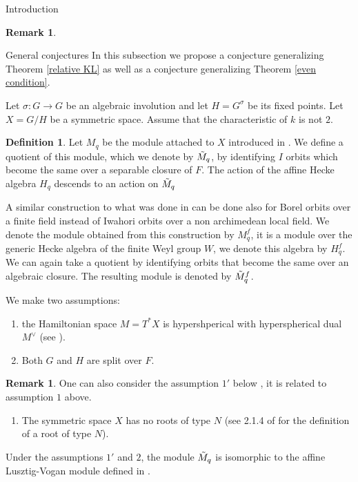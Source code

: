 \documentclass[12pt]{article}
\newcommand{\<}{\langle}
\renewcommand{\>}{\rangle}
\theoremstyle{plain}
\theoremstyle{definition}
\newtheorem{Remark}[theorem]{Remark}
\newtheorem{defn}[theorem]{Definition}
\begin{document}
\begin{section}{Introduction}
\begin{Remark}
\end{Remark}
  
 

\begin{subsection}{General conjectures}
In this subsection we propose a conjecture generalizing Theorem \ref{relative KL} as well as a conjecture generalizing Theorem \ref{even condition}. 

Let $\sigma:G\rightarrow G$ be an algebraic involution and let $H=G^\sigma$ be its fixed points. Let $X=G/H$ be a symmetric space. Assume that the characteristic of $k$ is not $2.$

\begin{defn}
Let $M_q$ be the module attached to $X$ introduced in \cite{my}. We define a quotient of this module, which we denote by $\Tilde{M}_q$, by identifying $I$ orbits which become the same over a separable closure of $F$. The action of the affine Hecke algebra $H_q$ descends to an action on $\Tilde{M}_q$ 


A similar construction to what was done in \cite{my} can be done also for Borel orbits over a finite field instead of Iwahori orbits over a non archimedean local field. We denote the module obtained from this construction by $M^f_q$, it is a module over the generic Hecke algebra of the finite Weyl group $W$, we denote this algebra by $H^f_q$. We can again take a quotient by identifying orbits that become the same over an algebraic closure. The resulting module is denoted by $\Tilde{M}^f_q$.

\end{defn}



We make two assumptions:
\begin{enumerate}
    \item the Hamiltonian space $M=T^*X$ is hypershperical with hyperspherical dual $M^\vee$ (see \cite{benzvi2024relativelanglandsduality}). 
   
    \item Both $G$ and $H$ are split over $F$.
\end{enumerate}

\begin{Remark}
    One can also consider the assumption $1'$ below , it is related to assumption $1$ above.
    \begin{enumerate}[label=\arabic*$'$.]
         \item The symmetric space $X$ has no roots of type $N$ (see 2.1.4 of \cite{Ressayre_2010} for the definition of a root of type $N$).
    \end{enumerate}
    Under the assumptions $1'$ and $2$, the module $\Tilde{M}_q$ is isomorphic to the affine Lusztig-Vogan module defined in \cite{chen2025singularitiesorbitclosuresloop}. 


\end{Remark}
\end{subsection}
\end{section}
\end{document}
